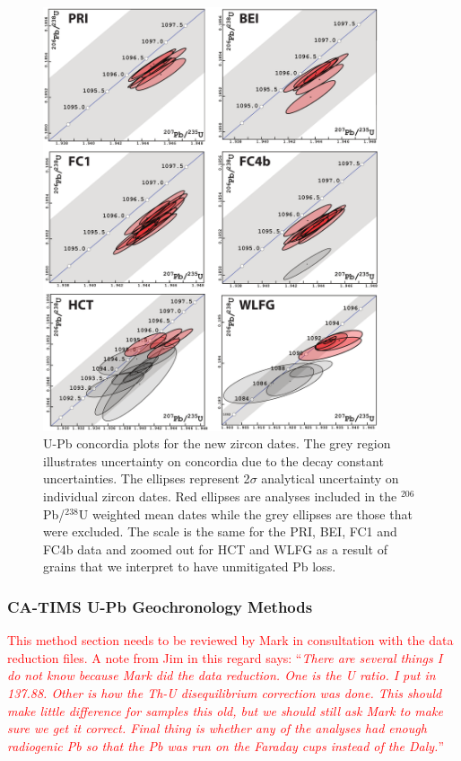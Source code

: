 \documentclass[11pt,letterpaper]{article}
\begin{document}
\renewcommand{\thefigure}{DR\arabic{figure}}
\begin{figure}[!ht]
\noindent\includegraphics[width=0.88\textwidth]{./repository/Concordia_Plots.pdf}
\centering
\caption{\small{U-Pb concordia plots for the new zircon dates. The grey region illustrates uncertainty on concordia due to the decay constant uncertainties. The ellipses represent  2$\sigma$ analytical uncertainty on individual zircon dates. Red ellipses are analyses included in the $^{206}$Pb/$^{238}$U weighted mean dates while the grey ellipses are those that were excluded. The scale is the same for the PRI, BEI, FC1 and FC4b data and zoomed out for HCT and WLFG as a result of grains that we interpret to have unmitigated Pb loss.}}
\label{fig:map}
\end{figure}

\subsubsection*{CA-TIMS U-Pb Geochronology Methods}

{\footnotesize\textcolor{red}{This method section needs to be reviewed by Mark in consultation with the data reduction files. A note from Jim in this regard says: ``\textit{There are several things I do not know because Mark did the data reduction. One is the U ratio. I put in 137.88. Other is how the Th-U disequilibrium correction was done. This should make little difference for samples this old, but we should still ask Mark to make sure we get it correct. Final thing is whether any of the analyses had enough radiogenic Pb so that the Pb was run on the Faraday cups instead of the Daly.}''}}
\end{document}
